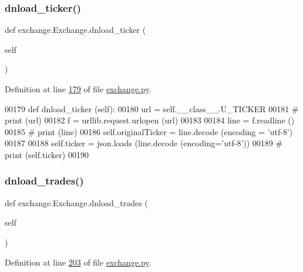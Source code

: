 \subsubsection{\texorpdfstring{dnload\+\_\+ticker()}{dnload\_ticker()}}
{\footnotesize\ttfamily def exchange.\+Exchange.\+dnload\+\_\+ticker (\begin{DoxyParamCaption}\item[{}]{self }\end{DoxyParamCaption})}



Definition at line \hyperlink{exchange_8py_source_l00179}{179} of file \hyperlink{exchange_8py_source}{exchange.\+py}.


\begin{DoxyCode}
00179     \textcolor{keyword}{def }dnload\_ticker (self):
00180         url = self.\_\_class\_\_.U\_TICKER
00181 \textcolor{comment}{#        print (url)}
00182         f = urllib.request.urlopen (url)
00183         
00184         line = f.readline ()
00185 \textcolor{comment}{#        print (line)}
00186         self.originalTicker = line.decode (encoding = \textcolor{stringliteral}{'utf-8'})
00187         
00188         self.ticker = json.loads (line.decode (encoding=\textcolor{stringliteral}{'utf-8'}))
00189 \textcolor{comment}{#        print (self.ticker)}
00190         
\end{DoxyCode}
\mbox{\label{classexchange_1_1_exchange_a202c8b57ffa0adcb830de89d6466fd60}} 
\subsubsection{\texorpdfstring{dnload\+\_\+trades()}{dnload\_trades()}}
{\footnotesize\ttfamily def exchange.\+Exchange.\+dnload\+\_\+trades (\begin{DoxyParamCaption}\item[{}]{self }\end{DoxyParamCaption})}



Definition at line \hyperlink{exchange_8py_source_l00203}{203} of file \hyperlink{exchange_8py_source}{exchange.\+py}.


